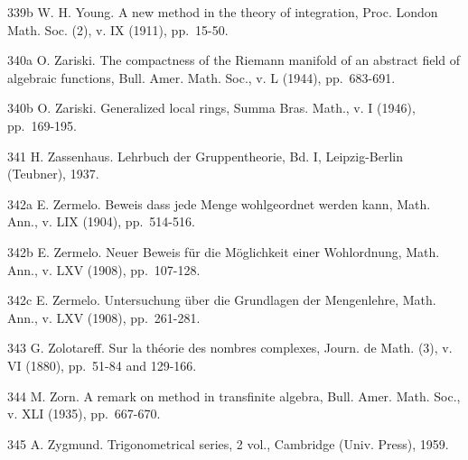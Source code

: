339b W. H. Young. A new method in the theory of integration, Proc. London Math. Soc. (2), v. IX (1911), pp.~15-50.

340a O. Zariski. The compactness of the Riemann manifold of an abstract field of algebraic functions, Bull. Amer. Math. Soc., v. L (1944), pp.~683-691.

340b O. Zariski. Generalized local rings, Summa Bras. Math., v. I (1946), pp.~169-195.

341 H. Zassenhaus. Lehrbuch der Gruppentheorie, Bd. I, Leipzig-Berlin (Teubner), 1937.

342a E. Zermelo. Beweis dass jede Menge wohlgeordnet werden kann, Math. Ann., v. LIX (1904), pp.~514-516.

342b E. Zermelo. Neuer Beweis für die Möglichkeit einer Wohlordnung, Math. Ann., v. LXV (1908), pp.~107-128.

342c E. Zermelo. Untersuchung über die Grundlagen der Mengenlehre, Math. Ann., v. LXV (1908), pp.~261-281.

343 G. Zolotareff. Sur la théorie des nombres complexes, Journ. de Math. (3), v. VI (1880), pp.~51-84 and 129-166.

344 M. Zorn. A remark on method in transfinite algebra, Bull. Amer. Math. Soc., v. XLI (1935), pp.~667-670.

345 A. Zygmund. Trigonometrical series, 2 vol., Cambridge (Univ. Press), 1959.
\relax{}
